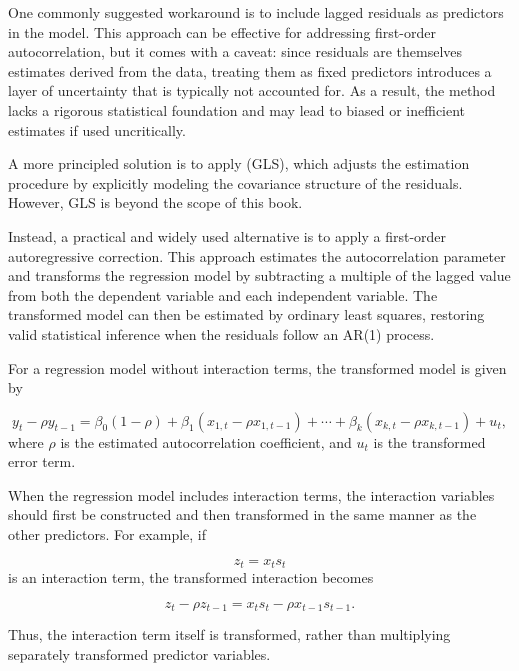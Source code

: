 One commonly suggested workaround is to include lagged residuals as predictors in the model. 
This approach can be effective for addressing first-order autocorrelation, but it comes with a caveat: since residuals are themselves estimates derived from the data, treating them as fixed predictors introduces a layer of uncertainty that is typically not accounted for. As a result, the method lacks a rigorous statistical foundation and may lead to biased or inefficient estimates if used uncritically.

A more principled solution is to apply  (GLS), which adjusts the estimation procedure by explicitly modeling the covariance structure of the residuals. However, GLS is beyond the scope of this book.

\bigskip
Instead, a practical and widely used alternative is to apply a first-order autoregressive correction. This approach estimates the autocorrelation parameter and transforms the regression model by subtracting a multiple of the lagged value from both the dependent variable and each independent variable. The transformed model can then be estimated by ordinary least squares, restoring valid statistical inference when the residuals follow an AR(1) process.

For a regression model without interaction terms, the transformed model is given by

\begin{equation}
  y_t - \rho y_{t-1}
  =
  \beta_0(1-\rho)
  + \beta_1(x_{1,t}-\rho x_{1,t-1})
  + \cdots
  + \beta_k(x_{k,t}-\rho x_{k,t-1})
  + u_t,
\end{equation}
where $\rho$ is the estimated autocorrelation coefficient, and $u_t$ is the trans\-formed error term.

\bigskip
When the regression model includes interaction terms, the interaction variables should first be constructed and then transformed in the same manner as the other predictors. For example, if

\[
z_t = x_t s_t
\]
is an interaction term, the transformed interaction becomes

\begin{equation}
  z_t - \rho z_{t-1}
  =
  x_t s_t - \rho x_{t-1}s_{t-1}.
\end{equation}

Thus, the interaction term itself is transformed, rather than multiplying separately transformed predictor variables.

